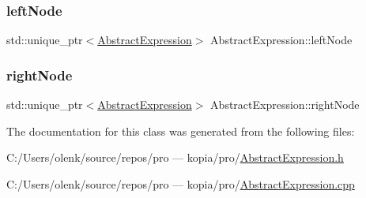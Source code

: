 \subsubsection{\texorpdfstring{leftNode}{leftNode}}
{\footnotesize\ttfamily std\+::unique\+\_\+ptr$<$\mbox{\hyperlink{class_abstract_expression}{Abstract\+Expression}}$>$ Abstract\+Expression\+::left\+Node\hspace{0.3cm}{\ttfamily [protected]}}

\mbox{\label{class_abstract_expression_a13e652b679ff14698b789056b4de92e0}} 
\subsubsection{\texorpdfstring{rightNode}{rightNode}}
{\footnotesize\ttfamily std\+::unique\+\_\+ptr$<$\mbox{\hyperlink{class_abstract_expression}{Abstract\+Expression}}$>$ Abstract\+Expression\+::right\+Node\hspace{0.3cm}{\ttfamily [protected]}}



The documentation for this class was generated from the following files\+:\begin{DoxyCompactItemize}
\item 
C\+:/\+Users/olenk/source/repos/pro — kopia/pro/\mbox{\hyperlink{_abstract_expression_8h}{Abstract\+Expression.\+h}}\item 
C\+:/\+Users/olenk/source/repos/pro — kopia/pro/\mbox{\hyperlink{_abstract_expression_8cpp}{Abstract\+Expression.\+cpp}}\end{DoxyCompactItemize}

